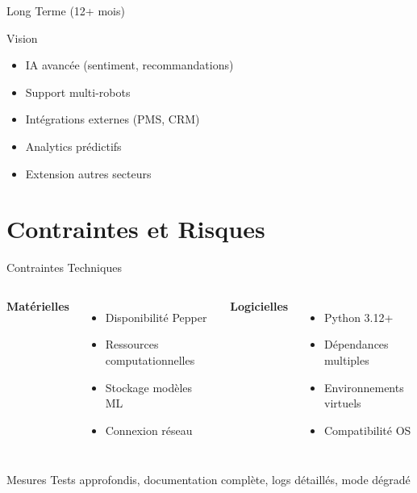 \documentclass[aspectratio=169,11pt]{beamer}
\begin{document}
\begin{frame}{Long Terme (12+ mois)}
\begin{block}{Vision}
\begin{itemize}
    \item[\textcolor{accentorange}{\faRocket}] IA avancée (sentiment, recommandations)
    \item[\textcolor{accentorange}{\faUsers}] Support multi-robots
    \item[\textcolor{accentorange}{\faPlug}] Intégrations externes (PMS, CRM)
    \item[\textcolor{accentorange}{\faChartBar}] Analytics prédictifs
    \item[\textcolor{accentorange}{\faGlobe}] Extension autres secteurs
\end{itemize}
\end{block}
\end{frame}


\section{Contraintes et Risques}

\begin{frame}{Contraintes Techniques}
\begin{columns}
\textbf{Matérielles}
\begin{itemize}
    \item Disponibilité Pepper
    \item Ressources computationnelles
    \item Stockage modèles ML
    \item Connexion réseau
\end{itemize}

\textbf{Logicielles}
\begin{itemize}
    \item Python 3.12+
    \item Dépendances multiples
    \item Environnements virtuels
    \item Compatibilité OS
\end{itemize}
\end{columns}

\begin{alertblock}{Mesures}
Tests approfondis, documentation complète, logs détaillés, mode dégradé
\end{alertblock}
\end{frame}
\end{document}
